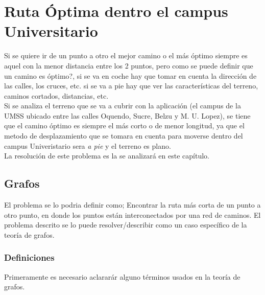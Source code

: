\label{cha:ruta_optima}
\chapter{Ruta Óptima dentro el campus Universitario} %


Si se quiere ir de un punto a otro el mejor camino o el más óptimo siempre es aquel con la menor distancia entre los 2 puntos, pero como se puede definir que un camino es óptimo?, si se va en coche hay que tomar en cuenta la dirección de las calles, los cruces, etc. si se va a pie hay que ver las características del terreno, caminos cortados, distancias, etc.\\


Si se analiza el terreno que se va a cubrir con la aplicación (el campus de la UMSS ubicado entre las calles Oquendo, Sucre,  Belzu y M. U. Lopez), se tiene que el camino óptimo es siempre el más corto o de menor longitud, ya que el metodo de desplazamiento que se tomara en cuenta para moverse dentro del campus Univeristario sera \emph{a pie} y el terreno es plano.\\


La resolución de este problema es la se analizará en este capítulo.


  \section{Grafos} %
  \label{sec:teoria_grafos}

    El problema se lo podria definir como; Encontrar la ruta más corta de un punto a otro punto, en donde los puntos están interconectados por una red de caminos. El problema descrito se lo puede resolver/describir como un caso espec\'ifico de la teoría de grafos.


    \subsection{Definiciones} %
    \label{sub:grafos_definiciones}
      Primeramente es necesario aclarar\'ar alguno términos usados en la teoría de grafos.\\



